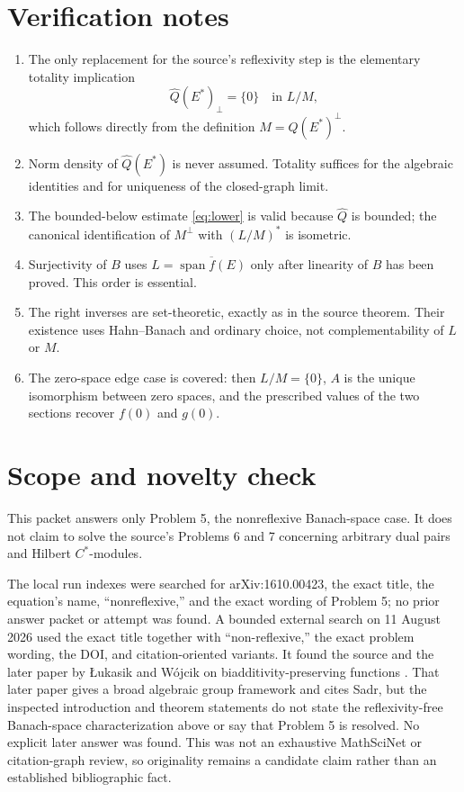 \documentclass[11pt]{article}
\newcommand{\linspan}{\operatorname{span}}
\begin{document}
\section{Verification notes}

\begin{enumerate}[leftmargin=*,itemsep=0.35em]
  \item The only replacement for the source's reflexivity step is the elementary totality implication
  \[
    \widehat Q(E^*)_\perp=\{0\}\quad\text{in }L/M,
  \]
  which follows directly from the definition $M=Q(E^*)^\perp$.
  \item Norm density of $\widehat Q(E^*)$ is never assumed. Totality suffices for the algebraic identities and for uniqueness of the closed-graph limit.
  \item The bounded-below estimate \eqref{eq:lower} is valid because $\widehat Q$ is bounded; the canonical identification of $M^\perp$ with $(L/M)^*$ is isometric.
  \item Surjectivity of $B$ uses $L=\overline{\linspan f(E)}$ only after linearity of $B$ has been proved. This order is essential.
  \item The right inverses are set-theoretic, exactly as in the source theorem. Their existence uses Hahn--Banach and ordinary choice, not complementability of $L$ or $M$.
  \item The zero-space edge case is covered: then $L/M=\{0\}$, $A$ is the unique isomorphism between zero spaces, and the prescribed values of the two sections recover $f(0)$ and $g(0)$.
\end{enumerate}

\section{Scope and novelty check}

This packet answers only Problem 5, the nonreflexive Banach-space case. It does not claim to solve the source's Problems 6 and 7 concerning arbitrary dual pairs and Hilbert $C^*$-modules.

The local run indexes were searched for arXiv:1610.00423, the exact title, the equation's name, ``nonreflexive,'' and the exact wording of Problem 5; no prior answer packet or attempt was found. A bounded external search on 11 August 2026 used the exact title together with ``non-reflexive,'' the exact problem wording, the DOI, and citation-oriented variants. It found the source and the later paper by \L ukasik and W\'ojcik on biadditivity-preserving functions \cite{LukasikWojcik2020}. That later paper gives a broad algebraic group framework and cites Sadr, but the inspected introduction and theorem statements do not state the reflexivity-free Banach-space characterization above or say that Problem 5 is resolved. No explicit later answer was found. This was not an exhaustive MathSciNet or citation-graph review, so originality remains a candidate claim rather than an established bibliographic fact.
\end{document}
